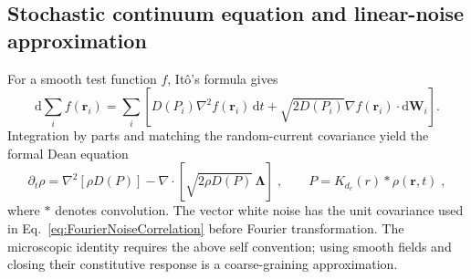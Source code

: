 \documentclass{article}
\begin{document}
\subsection{Stochastic continuum equation and linear-noise approximation}

For a smooth test function $f$, It\^{o}'s formula gives
\begin{equation}
    \mathrm d\sum_i f(\mathbf r_i)
    =\sum_i\left[D(P_i)\nabla^2f(\mathbf r_i)\,\mathrm dt
    +\sqrt{2D(P_i)}\nabla f(\mathbf r_i)\cdot\mathrm d\mathbf W_i\right].
\end{equation}
Integration by parts and matching the random-current covariance yield the formal Dean equation
\begin{equation}
    \partial_t\rho=\nabla^2[\rho D(P)]
    -\nabla\cdot[\sqrt{2\rho D(P)}\,\boldsymbol\Lambda]\;,
    \qquad 
    P=K_{d_c}\left( r \right) *\rho \left( \mathbf{r},t \right)\;,
    \label{eq:ffDean}
\end{equation}
where $*$ denotes convolution. 
The vector white noise has the unit covariance used in Eq.~\eqref{eq:FourierNoiseCorrelation} before Fourier transformation. The microscopic identity requires the above self convention; using smooth fields and closing their constitutive response is a coarse-graining approximation.
\end{document}
